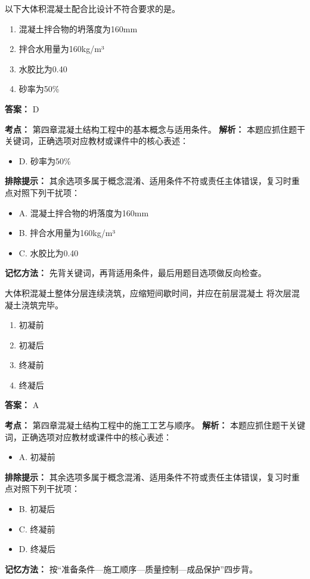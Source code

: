 \documentclass[UTF8,fontset=fandol,11pt]{ctexart}
\begin{document}
\begin{quizbox}[title={第 86 题}]
以下大体积混凝土配合比设计不符合要求的是。\\
\begin{enumerate}[label=\Alph*.]
\item 混凝土拌合物的坍落度为160mm
\item 拌合水用量为160kg/m³
\item 水胶比为0.40
\item 砂率为50\%
\end{enumerate}
\textbf{答案：} D
\vspace{0.25em}
\begin{answerbox}[title={考点解析}]
\textbf{考点：} 第四章混凝土结构工程中的基本概念与适用条件。
\textbf{解析：} 本题应抓住题干关键词，正确选项对应教材或课件中的核心表述：
\begin{itemize}
\item D. 砂率为50\%
\end{itemize}
\textbf{排除提示：} 其余选项多属于概念混淆、适用条件不符或责任主体错误，复习时重点对照下列干扰项：
\begin{itemize}
\item A. 混凝土拌合物的坍落度为160mm
\item B. 拌合水用量为160kg/m³
\item C. 水胶比为0.40
\end{itemize}
\textbf{记忆方法：} 先背关键词，再背适用条件，最后用题目选项做反向检查。
\end{answerbox}
\end{quizbox}

\vspace{0.2em}

\begin{quizbox}[title={第 87 题}]
大体积混凝土整体分层连续浇筑，应缩短间歇时间，并应在前层混凝土 将次层混凝土浇筑完毕。\\
\begin{enumerate}[label=\Alph*.]
\item 初凝前
\item 初凝后
\item 终凝前
\item 终凝后
\end{enumerate}
\textbf{答案：} A
\vspace{0.25em}
\begin{answerbox}[title={考点解析}]
\textbf{考点：} 第四章混凝土结构工程中的施工工艺与顺序。
\textbf{解析：} 本题应抓住题干关键词，正确选项对应教材或课件中的核心表述：
\begin{itemize}
\item A. 初凝前
\end{itemize}
\textbf{排除提示：} 其余选项多属于概念混淆、适用条件不符或责任主体错误，复习时重点对照下列干扰项：
\begin{itemize}
\item B. 初凝后
\item C. 终凝前
\item D. 终凝后
\end{itemize}
\textbf{记忆方法：} 按“准备条件—施工顺序—质量控制—成品保护”四步背。
\end{answerbox}
\end{quizbox}
\end{document}
